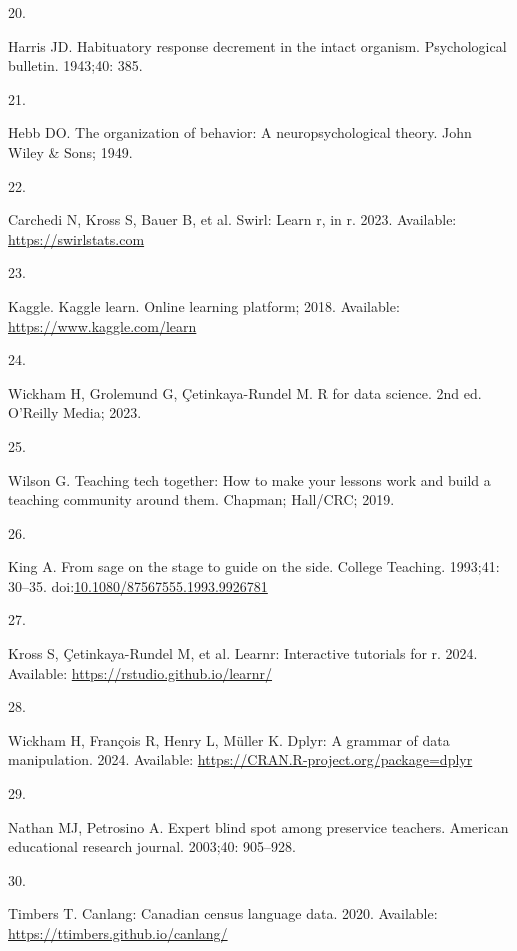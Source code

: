 \documentclass[
  10pt,
  letterpaper,
]{article}
\newlength{\cslhangindent}
\newlength{\csllabelwidth}
\newenvironment{CSLReferences}[2] %
 {\begin{list}{}{%
  \setlength{\itemindent}{0pt}
  \setlength{\leftmargin}{0pt}
  \setlength{\parsep}{0pt}
  \ifodd #1
   \setlength{\leftmargin}{\cslhangindent}
   \setlength{\itemindent}{-1\cslhangindent}
  \fi
  \setlength{\itemsep}{#2\baselineskip}}}
 {\end{list}}
\newcommand{\CSLLeftMargin}[1]{\parbox[t]{\csllabelwidth}{\strut#1\strut}}
\newcommand{\CSLRightInline}[1]{\parbox[t]{\linewidth - \csllabelwidth}{\strut#1\strut}}
\begin{document}
\begin{CSLReferences}{0}{1}
\CSLLeftMargin{20. }%
\CSLRightInline{Harris JD. Habituatory response decrement in the intact
organism. Psychological bulletin. 1943;40: 385. }

\CSLLeftMargin{21. }%
\CSLRightInline{Hebb DO. The organization of behavior: A
neuropsychological theory. John Wiley \& Sons; 1949. }

\CSLLeftMargin{22. }%
\CSLRightInline{Carchedi N, Kross S, Bauer B, et al. Swirl: Learn r, in
r. 2023. Available: \url{https://swirlstats.com}}

\CSLLeftMargin{23. }%
\CSLRightInline{Kaggle. Kaggle learn. Online learning platform; 2018.
Available: \url{https://www.kaggle.com/learn}}

\CSLLeftMargin{24. }%
\CSLRightInline{Wickham H, Grolemund G, Çetinkaya-Rundel M. R for data
science. 2nd ed. O'Reilly Media; 2023. }

\CSLLeftMargin{25. }%
\CSLRightInline{Wilson G. Teaching tech together: How to make your
lessons work and build a teaching community around them. Chapman;
Hall/CRC; 2019. }

\CSLLeftMargin{26. }%
\CSLRightInline{King A. From sage on the stage to guide on the side.
College Teaching. 1993;41: 30--35.
doi:\href{https://doi.org/10.1080/87567555.1993.9926781}{10.1080/87567555.1993.9926781}}

\CSLLeftMargin{27. }%
\CSLRightInline{Kross S, Çetinkaya-Rundel M, et al. Learnr: Interactive
tutorials for r. 2024. Available:
\url{https://rstudio.github.io/learnr/}}

\CSLLeftMargin{28. }%
\CSLRightInline{Wickham H, François R, Henry L, Müller K. Dplyr: A
grammar of data manipulation. 2024. Available:
\url{https://CRAN.R-project.org/package=dplyr}}

\CSLLeftMargin{29. }%
\CSLRightInline{Nathan MJ, Petrosino A. Expert blind spot among
preservice teachers. American educational research journal. 2003;40:
905--928. }

\CSLLeftMargin{30. }%
\CSLRightInline{Timbers T. Canlang: Canadian census language data. 2020.
Available: \url{https://ttimbers.github.io/canlang/}}


\end{CSLReferences}
\end{document}
